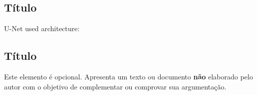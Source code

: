 \documentclass[
        oneside,      %
        english,			
        brazil			 
        ]{abntbibufjf}
\begin{document}





\begin{apendices}

\chapter{\apendseq T\'itulo} 

U-Net used architecture:



\end{apendices}


\begin{anexos}

\chapter{\anexoseq T\'itulo} 

Este elemento \'e opcional. Apresenta um texto ou documento \textbf{n\~ao} elaborado pelo autor com o objetivo de complementar ou comprovar sua 
argumenta\c{c}\~ao. 

  
\end{anexos}


\end{document}
